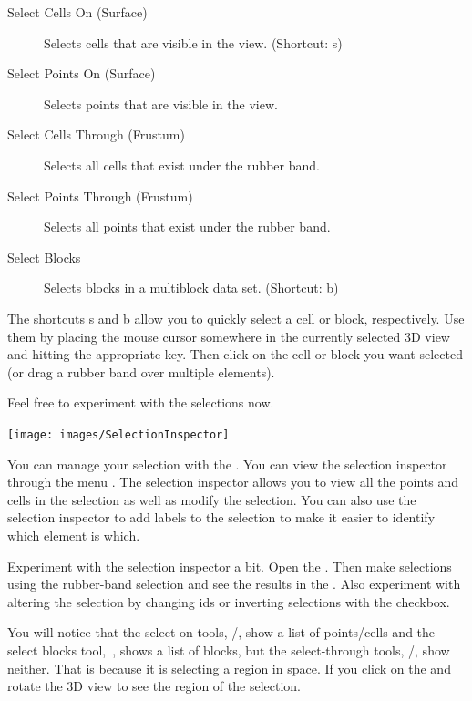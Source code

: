 \begin{description}
\item[\selectCellsOn Select Cells On (Surface)] Selects cells that are
  visible in the view.  (Shortcut: s)
\item[\selectPointsOn Select Points On (Surface)] Selects points that are
  visible in the view.
\item[\selectCellsThrough Select Cells Through (Frustum)] Selects all cells
  that exist under the rubber band.
\item[\selectPointsThrough Select Points Through (Frustum)] Selects all
  points that exist under the rubber band.
\item[\selectBlocks Select Blocks] Selects blocks in a
  multiblock data set.  (Shortcut: b)
\end{description}

The shortcuts s and b allow you to quickly select a cell or block,
respectively.  Use them by placing the mouse cursor somewhere in the
currently selected 3D view and hitting the appropriate key.  Then click on
the cell or block you want selected (or drag a rubber band over multiple
elements).

Feel free to experiment with the selections now.

\begin{inlinefig}
  \texttt{[image: images/SelectionInspector]}
\end{inlinefig}

You can manage your selection with the .  You
can view the selection inspector through the menu  \ra
{}.  The selection inspector allows you to view all
the points and cells in the selection as well as modify the selection.  You
can also use the selection inspector to add labels to the selection to make
it easier to identify which element is which.

Experiment with the selection inspector a bit.  Open the .  Then make selections using the rubber-band selection and see
the results in the .  Also experiment with
altering the selection by changing ids or inverting selections with the
 checkbox.

You will notice that the select-on tools, \selectCellsOn/\selectPointsOn,
show a list of points/cells and the select blocks tool,~\selectBlocks,
shows a list of blocks, but the select-through tools,
\selectCellsThrough/\selectPointsThrough, show neither.  That is because it
is selecting a region in space.  If you click on the  and
rotate the 3D view to see the region of the selection.

